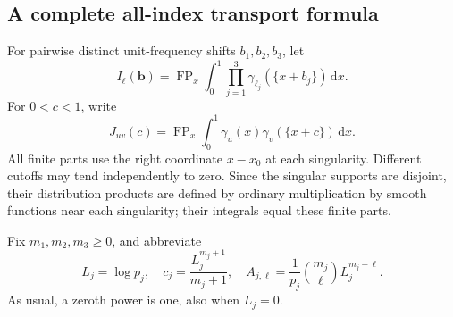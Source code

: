 \documentclass[11pt,a4paper]{article}
\numberwithin{equation}{section}
\theoremstyle{definition}
\theoremstyle{remark}
\DeclareMathOperator{\FP}{FP}
\newcommand{\dd}{\,\mathrm d}
\begin{document}
\subsection{A complete all-index transport formula}
For pairwise distinct unit-frequency shifts $b_1,b_2,b_3$, let
\begin{equation}\label{tr:Idef}
 I_{\boldsymbol\ell}(\boldsymbol b)
   =\FP_x\int_0^1\prod_{j=1}^3
              \gamma_{\ell_j}(\{x+b_j\})\dd x.
\end{equation}
For $0<c<1$, write
\begin{equation}\label{tr:Jdef}
 J_{uv}(c)=\FP_x\int_0^1
           \gamma_u(x)\gamma_v(\{x+c\})\dd x.
\end{equation}
All finite parts use the right coordinate $x-x_0$ at each singularity.
Different cutoffs may tend independently to zero. Since the singular
supports are disjoint, their distribution products are defined by
ordinary multiplication by smooth functions near each singularity;
their integrals equal these finite parts.

Fix $m_1,m_2,m_3\geq0$, and abbreviate
\[
 L_j=\log p_j,\quad c_j=\frac{L_j^{m_j+1}}{m_j+1},\quad
 A_{j,\ell}=\frac1{p_j}\binom{m_j}{\ell}L_j^{m_j-\ell}.
\]
As usual, a zeroth power is one, also when $L_j=0$.
\end{document}
